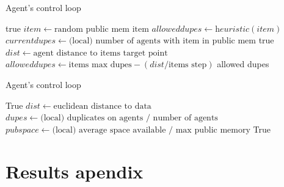 \documentclass{UoYCSproject}
\begin{document}
\begin{algorithm}
\caption{Agent's control loop}
\label{Agent_Control_Loop}
\begin{algorithmic}[1]
\State {}
\State
{}
\State {}
\State \Return true
\EndIf
\State
\State $item \gets \text{random public mem item}$
\State $allowed dupes \gets \textit{heuristic}(item)$
\State $current dupes \gets \text{(local) number of agents with item in public mem}$
\State
{}
\State {}
\State {}
\Else
\State {}
\EndIf
\State
\State \Return true
\EndProcedure
\State
{}
\State $dist  \gets \text{agent distance to items target point}$
\State $allowed dupes \gets \text{items max dupes} - (dist / \text{items step})$
\State
{}
\State {}
\Else
\State \Return allowed dupes
\EndIf
\EndProcedure
\end{algorithmic}
\end{algorithm}


\begin{algorithm}
\caption{Agent's control loop}
\label{Agent_Control_Loop2}
\begin{algorithmic}[1]
\State {}
\State
{}
\State {}
\State \Return True
\EndIf
\State
\State $dist \gets \text{euclidean distance to data}$
\State $dupes \gets \text{(local) duplicates on agents / number of agents}$
\State $pub space \gets \text{(local) average space available / max public memory}$
\State
{}
\State {}
\EndIf
\State
{}
\State {}
\EndIf
\State
\State {}
\State
\State \Return True
\EndProcedure
\end{algorithmic}
\end{algorithm}


\chapter{Results apendix}
\end{document}
